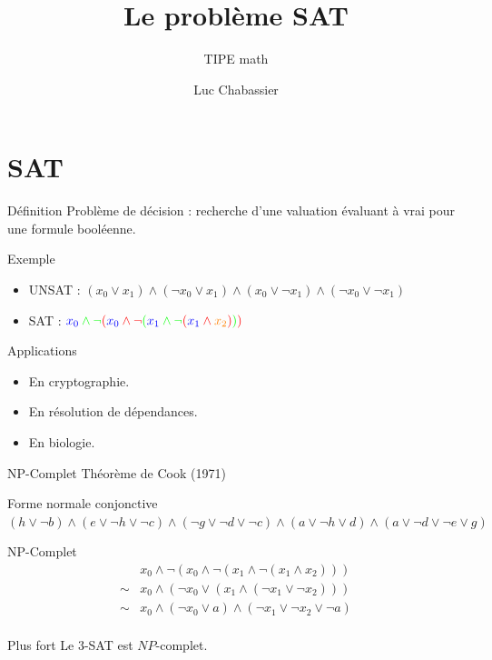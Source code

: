 \documentclass{beamer}
\title{Le problème SAT}
\subtitle{TIPE math}
\author{Luc Chabassier}
\institute{Lycée Pierre de Fermat}
\begin{document}
\section{SAT}
\begin{frame}
    \maketitle
    \begin{block}{Définition}
        Problème de décision : recherche d'une valuation évaluant à vrai pour une formule booléenne.
    \end{block}

    \begin{exampleblock}{Exemple}
        \begin{itemize}
            \item UNSAT : $(x_0\vee x_1) \wedge (\neg x_0\vee x_1) \wedge (x_0\vee\neg x_1) \wedge (\neg x_0\vee\neg x_1)$
            \item SAT : ${\color{green}{\color{blue}x_0}\wedge\neg{\color{red}({\color{blue}x_0}\wedge\neg{\color{green}({\color{blue}x_1}\wedge\neg{\color{red}({\color{blue}x_1}\wedge {\color{orange}x_2})})})}}$
        \end{itemize}
    \end{exampleblock}
    \begin{exampleblock}{Applications}
        \begin{itemize}
            \item En cryptographie.
            \item En résolution de dépendances.
            \item En biologie.
        \end{itemize}
    \end{exampleblock}
    \begin{alertblock}{NP-Complet}
        Théorème de Cook (1971)
    \end{alertblock}
    \begin{exampleblock}{Forme normale conjonctive}
        $(h\vee\neg b) \wedge (e\vee\neg h\vee\neg c) \wedge (\neg g\vee\neg d\vee\neg c) \wedge (a\vee\neg h\vee d) \wedge (a\vee\neg d\vee\neg e\vee g)$
    \end{exampleblock}
    \begin{block}{NP-Complet}
        \[ \begin{array}{cl}
                & x_0 \wedge \neg(x_0 \wedge \neg(x_1 \wedge \neg (x_1 \wedge x_2))) \\
                \sim & x_0 \wedge (\neg x_0 \vee (x_1 \wedge (\neg x_1 \vee \neg x_2))) \\
                \sim & x_0 \wedge (\neg x_0 \vee a) \wedge (\neg x_1 \vee \neg x_2 \vee \neg a) \\
           \end{array}
        \]
    \end{block}
    \begin{alertblock}{Plus fort}
        Le $3$-SAT est $NP$-complet.
    \end{alertblock}
\end{frame}
\end{document}
